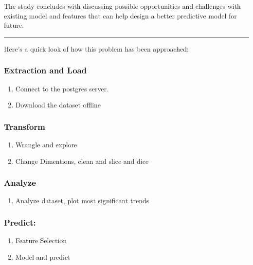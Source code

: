 \documentclass[11pt]{article}
\providecommand{\tightlist}{%
      \setlength{\itemsep}{0pt}\setlength{\parskip}{0pt}}
\begin{document}
The study concludes with discussing possible opportunities and
challenges with existing model and features that can help design a
better predictive model for future.

\begin{center}\rule{0.5\linewidth}{\linethickness}\end{center}

Here's a quick look of how this problem has been approached:

\subsubsection{Extraction and Load}\label{extraction-and-load}

\begin{enumerate}
\def\labelenumi{\arabic{enumi}.}
\tightlist
\item
  Connect to the postgres server.
\item
  Download the dataset offline
\end{enumerate}

\subsubsection{Transform}\label{transform}

\begin{enumerate}
\def\labelenumi{\arabic{enumi}.}
\setcounter{enumi}{2}
\tightlist
\item
  Wrangle and explore
\item
  Change Dimentions, clean and slice and dice
\end{enumerate}

\subsubsection{Analyze}\label{analyze}

\begin{enumerate}
\def\labelenumi{\arabic{enumi}.}
\setcounter{enumi}{4}
\tightlist
\item
  Analyze dataset, plot most significant trends
\end{enumerate}

\subsubsection{Predict:}\label{predict}

\begin{enumerate}
\def\labelenumi{\arabic{enumi}.}
\setcounter{enumi}{5}
\tightlist
\item
  Feature Selection
\item
  Model and predict
\end{enumerate}
\end{document}
